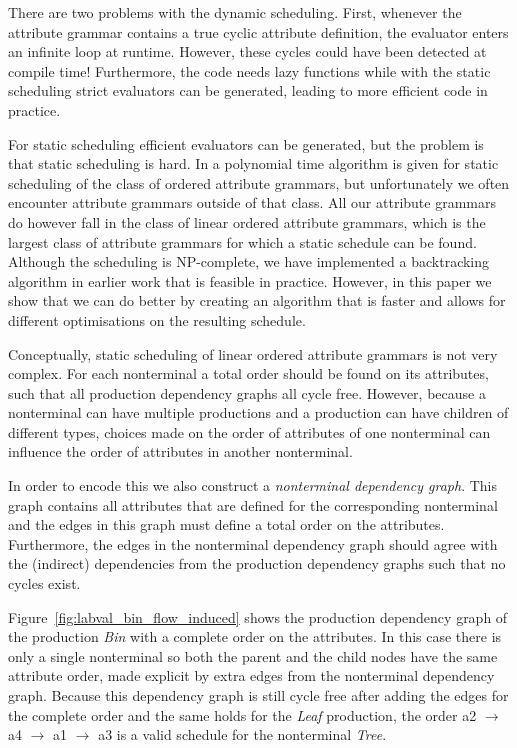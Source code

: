 \documentclass{llncs}
\newcommand{\figref}[1]{Figure~\ref{#1}}
\begin{document}
There are two problems with the dynamic scheduling. First, whenever the attribute grammar contains a true cyclic attribute definition, the evaluator enters an infinite loop at runtime. However, these cycles could have been detected at compile time! Furthermore, the code needs lazy functions while with the static scheduling strict evaluators can be generated, leading to more efficient code in practice.

For static scheduling efficient evaluators can be generated, but the problem is that static scheduling is hard. In \cite{kastens80} a polynomial time algorithm is given for static scheduling of the class of ordered attribute grammars, but unfortunately we often encounter attribute grammars outside of that class. All our attribute grammars do however fall in the class of linear ordered attribute grammars, which is the largest class of attribute grammars for which a static schedule can be found. Although the scheduling is NP-complete, we have implemented a backtracking algorithm in earlier work \cite{Binsbergen:2015} that is feasible in practice. However, in this paper we show that we can do better by creating an algorithm that is faster and allows for different optimisations on the resulting schedule.

Conceptually, static scheduling of linear ordered attribute grammars is not very complex. For each nonterminal a total order should be found on its attributes, such that all production dependency graphs all cycle free. However, because a nonterminal can have multiple productions and a production can have children of different types, choices made on the order of attributes of one nonterminal can influence the order of attributes in another nonterminal.

In order to encode this we also construct a \emph{nonterminal dependency graph}. This graph contains all attributes that are defined for the corresponding nonterminal and the edges in this graph must define a total order on the attributes. Furthermore, the edges in the nonterminal dependency graph should agree with the (indirect) dependencies from the production dependency graphs such that no cycles exist.


\figref{fig:labval_bin_flow_induced} shows the production dependency graph of the production \emph{Bin} with a complete order on the attributes. In this case there is only a single nonterminal so both the parent and the child nodes have the same attribute order, made explicit by extra edges from the nonterminal dependency graph. Because this dependency graph is still cycle free after adding the edges for the complete order and the same holds for the \emph{Leaf} production, the order a2 $\rightarrow$ a4 $\rightarrow$ a1 $\rightarrow$ a3 is a valid schedule for the nonterminal \emph{Tree}.
\end{document}
